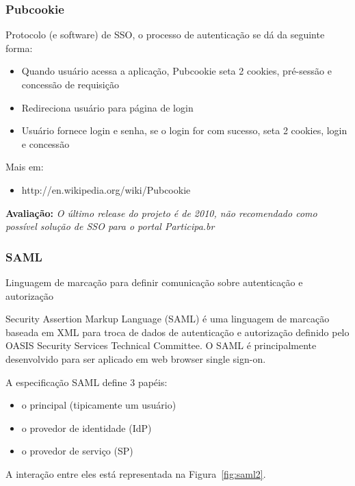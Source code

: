 \documentclass[11pt]{article}
\begin{document}
\subsubsection{Pubcookie}

Protocolo (e software) de SSO, o processo de autenticação se dá da seguinte
forma:

\begin{itemize}
  \item{Quando usuário acessa a aplicação, Pubcookie seta 2 cookies, pré-sessão e concessão de requisição}
  \item{Redireciona usuário para página de login}
  \item{Usuário fornece login e senha, se o login for com sucesso, seta 2 cookies, login e concessão}
\end{itemize}

Mais em:
\begin{itemize}
  \item{http://en.wikipedia.org/wiki/Pubcookie}
\end{itemize}

{\bf Avaliação:} {\it O último release do projeto é de 2010, não recomendado
como possível solução de SSO para o portal Participa.br}

\subsubsection{SAML}

Linguagem de marcação para definir comunicação sobre autenticação e autorização

Security Assertion Markup Language (SAML) é uma linguagem de marcação baseada
em XML para troca de dados de autenticação e autorização definido pelo OASIS
Security Services Technical Committee. O SAML é principalmente desenvolvido
para ser aplicado em web browser single sign-on.

A especificação SAML define 3 papéis:
\begin{itemize}
  \item{o principal (tipicamente um usuário)}
  \item{o provedor de identidade (IdP)}
  \item{o provedor de serviço (SP)}
\end{itemize}

A interação entre eles está representada na Figura~\ref{fig:saml2}.
\end{document}
